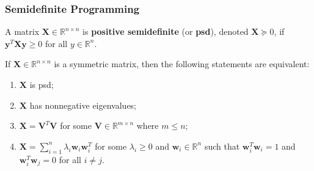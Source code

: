 \documentclass{beamer}
\newcommand{\RR}{\mathbb{R}}
\begin{document}
    \begin{frame}
        \frametitle{Semidefinite Programming}
    
        \begin{definition}
            A matrix $\mathbf X \in \RR^{n \times n}$ is {\bf positive semidefinite} (or {\bf psd}), denoted $\mathbf X \succeq 0$, if $\mathbf y^T \mathbf X \mathbf y \geq 0$ for all $y \in \RR^n$.
        \end{definition}

        \begin{fact}
            If $\mathbf X \in \RR^{n \times n}$ is a symmetric matrix, then the following statements are equivalent:
            \begin{enumerate}
                \item $\mathbf X$ is psd;
                \item $\mathbf X$ has nonnegative eigenvalues;
                \item $\mathbf X = \mathbf V^T \mathbf V$ for some $\mathbf V \in \RR^{m \times n}$ where $m \leq n$;
                \item $\mathbf X = \sum_{i = 1}^n \lambda_i \mathbf w_i \mathbf w_i^T$ for some $\lambda_i \geq 0$ and $\mathbf w_i \in \RR^n$ such that $\mathbf w_i^T \mathbf w_i = 1$ and $\mathbf w_i^T \mathbf w_j = 0$ for all $i \neq j$.
            \end{enumerate}
        \end{fact}
    \end{frame}
\end{document}
